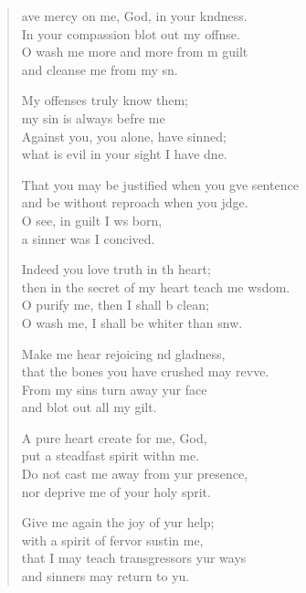 \settowidth{\versewidth}{That you may be justified when you give sentence *}
\begin{verse}%
  \begin{patverse}
    ave mercy on me, God, in your k\pointup{\i}ndness.\Med\\
In your compassion blot out my offnse.\\
O wash me more and more from m guilt\Med\\
and cleanse me from my s\pointup{\i}n.

My offenses truly  know them;\Med\\
my sin is always befre me\\
Against you, you alone, have  sinned;\Med\\
what is evil in your sight I have dne.

That you may be justified when you g\pointup{\i}ve sentence\Med\\
and be without reproach when you jdge.\\
O see, in guilt I ws born,\Med\\
a sinner was I concived.

Indeed you love truth in th heart;\Med\\
then in the secret of my heart teach me w\pointup{\i}sdom.\\
O purify me, then I shall b clean;\Med\\
O wash me, I shall be whiter than snw.

Make me hear rejoicing nd gladness,\Med\\
that the bones you have crushed may rev\pointup{\i}ve.\\
From my sins turn away yur face\Med\\
and blot out all my gilt.

A pure heart create for me,  God,\Med\\
put a steadfast spirit with\pointup{\i}n me.\\
Do not cast me away from yur presence,\Med\\
nor deprive me of your holy sp\pointup{\i}rit.

Give me again the joy of yur help;\Med\\
with a spirit of fervor sustin me,\\
that I may teach transgressors yur ways\Med\\
and sinners may return to yu.


\end{patverse}
\end{verse}
